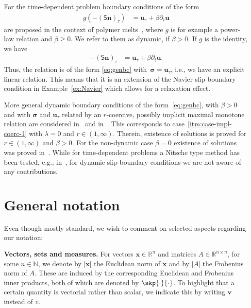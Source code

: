 \documentclass[reqno,a4paper]{amsart}
\def\tens#1{\pmb{\mathsf{#1}}}
\def\vec#1{\boldsymbol{#1}}
\def\R{\mathbb{R}}
\def\bn{\vec{n}}
\def\bu{\vec{u}}
\def\bv{\vec{v}}
\def\bx{\vec{x}}
\def\bsigma{\vec{\sigma}}
\def\BS{\tens{S}}
\begin{document}
	
	\begin{example}
		For the time-dependent problem boundary conditions of the form 
		\begin{align}
			g(- (\BS \bn)_{\tau})  &= \bu_\tau %
			+ \beta \partial_t \bu
		\end{align}
		are proposed in the context of polymer melts~\cite{Hatzikiriakos2012}, where $g$ is for example a power-law relation and $\beta \geq 0$. 
		We refer to them as dynamic, if $\beta>0$.  
		If $g$ is the identity, we have
		\begin{align}
			- (\BS \bn)_{\tau}  &= \bu_\tau %
			+ \beta \partial_t \bu.
		\end{align}
		Thus, the relation is of the form \eqref{eq:genbc} with~$\bsigma = \bu_\tau$, i.e., we have an explicit linear relation. 
		This means that it is an extension of the Navier slip boundary condition in Example~\ref{ex:Navier} which allows for a relaxation  effect. 
		
		More general dynamic boundary conditions of the form~\eqref{eq:genbc}, with $\beta>0$ and  with $\bsigma$ and $\bu_\tau$ related by an $r$-coercive, possibly implicit maximal monotone relation are considered in~\cite[Ch.~8-10]{Maringova2019} and in~\cite{Abbatiello2021}. 
		This corresponds to case~\eqref{itm:case-impl-coerc-1} with $\lambda  = 0$ and $r \in (1,\infty)$. 
		Therein, existence of solutions is proved for $r\in (1,\infty)$ and $\beta > 0$. 
		For the non-dynamic case $\beta = 0$ existence of solutions was proved in~\cite{BulicekMalekMaringova2023}. 
		While for time-dependent problems a Nitsche type method has been tested, e.g., in~\cite{BansalBarnafiPandey2024}, for dynamic slip boundary conditions we are not aware of any contributions. 
	\end{example}
	
	\section*{General notation}
	\noindent Even though mostly standard, we wish to comment on selected aspects regarding our notation:
	
	\textbf{Vectors, sets and measures.} 
	For vectors $\bx\in\R^{n}$ and matrices $A\in\R^{n\times n}$, for some $n \in \mathbb{N}$, we denote by $|\bx|$ the Euclidean norm of $\bx$ and by $|A|$ the Frobenius norm of $A$. 
	These are induced by the corresponding Euclidean and Frobenius inner products, both of which are denoted by $\skp{\cdot}{\cdot}$. 
	To highlight that a certain quantity is vectorial rather than scalar, we indicate this by writing $\bv$ instead of $v$. 
	
\end{document}
